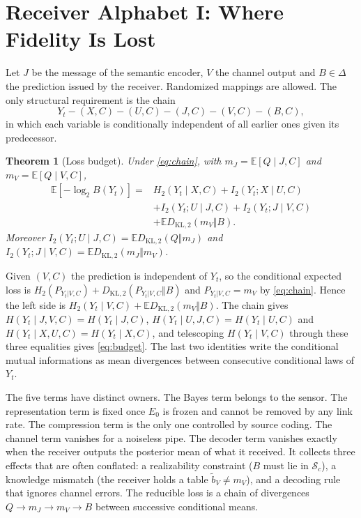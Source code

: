 \documentclass[10pt,journal]{IEEEtran}
\newtheorem{theorem}{Theorem}
\newcommand{\E}{\mathbb E}
\newcommand{\Sset}{\mathcal S}
\newcommand{\KLb}{D_{\mathrm{KL},2}}
\begin{document}
\section{Receiver Alphabet I: Where Fidelity Is Lost}\label{sec:budget}
Let $J$ be the message of the semantic encoder, $V$ the channel output and $B\in\Delta$ the prediction issued by the receiver. Randomized mappings are allowed. The only structural requirement is the chain
\begin{equation}
 Y_t - (X,C) - (U,C) - (J,C) - (V,C) - (B,C), \label{eq:chain}
\end{equation}
in which each variable is conditionally independent of all earlier ones given its predecessor.
\begin{theorem}[Loss budget]\label{thm:budget}
Under \eqref{eq:chain}, with $m_J=\E[Q\mid J,C]$ and $m_V=\E[Q\mid V,C]$,
\begin{align}
 \E[-\log_2B(Y_t)]={}&H_2(Y_t\mid X,C)+I_2(Y_t;X\mid U,C)\nonumber\\
 &+I_2(Y_t;U\mid J,C)+I_2(Y_t;J\mid V,C)\nonumber\\
 &+\E\KLb(m_V\Vert B). \label{eq:budget}
\end{align}
Moreover $I_2(Y_t;U\mid J,C)=\E\KLb(Q\Vert m_J)$ and $I_2(Y_t;J\mid V,C)=\E\KLb(m_J\Vert m_V)$.
\end{theorem}
\begin{IEEEproof}
Given $(V,C)$ the prediction is independent of $Y_t$, so the conditional expected loss is $H_2(P_{Y_t|V,C})+\KLb(P_{Y_t|V,C}\Vert B)$ and $P_{Y_t|V,C}=m_V$ by \eqref{eq:chain}. Hence the left side is $H_2(Y_t\mid V,C)+\E\KLb(m_V\Vert B)$. The chain gives $H(Y_t\mid J,V,C)=H(Y_t\mid J,C)$, $H(Y_t\mid U,J,C)=H(Y_t\mid U,C)$ and $H(Y_t\mid X,U,C)=H(Y_t\mid X,C)$, and telescoping $H(Y_t\mid V,C)$ through these three equalities gives \eqref{eq:budget}. The last two identities write the conditional mutual informations as mean divergences between consecutive conditional laws of $Y_t$.
\end{IEEEproof}
The five terms have distinct owners. The Bayes term belongs to the sensor. The representation term is fixed once $E_0$ is frozen and cannot be removed by any link rate. The compression term is the only one controlled by source coding. The channel term vanishes for a noiseless pipe. The decoder term vanishes exactly when the receiver outputs the posterior mean of what it received. It collects three effects that are often conflated: a realizability constraint ($B$ must lie in $\Sset_c$), a knowledge mismatch (the receiver holds a table $\tilde b_V\ne m_V$), and a decoding rule that ignores channel errors. The reducible loss is a chain of divergences $Q\to m_J\to m_V\to B$ between successive conditional means.
\end{document}
